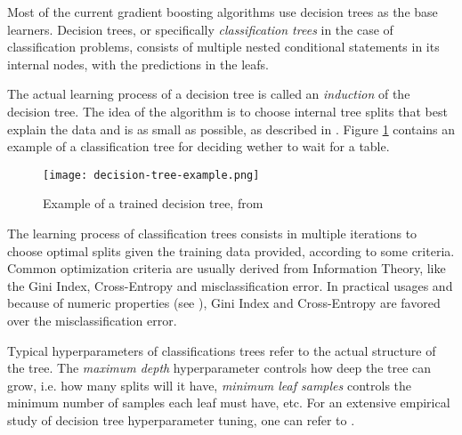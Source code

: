 Most of the current gradient boosting algorithms use decision trees as the base learners. Decision trees, or specifically \textit{classification trees} in the case of classification problems, consists of multiple nested conditional statements in its internal nodes, with the predictions in the leafs.

The actual learning process of a decision tree is called an \textit{induction} of the decision tree. The idea of the algorithm is to choose internal tree splits that best explain the data and is as small as possible, as described in \cite{aima:2010}. Figure \ref{fig:decision-tree-example} contains an example of a classification tree for deciding wether to wait for a table.

\begin{figure}[!h]
    \centering
    \texttt{[image: decision-tree-example.png]} 
    \caption{Example of a trained decision tree, from \cite{aima:2010}}
    \label{fig:decision-tree-example}
\end{figure}

The learning process of classification trees consists in multiple iterations to choose optimal splits given the training data provided, according to some criteria. Common optimization criteria are usually derived from Information Theory, like the Gini Index, Cross-Entropy and misclassification error. In practical usages and because of numeric properties (see \cite{hastie2009elements}), Gini Index and Cross-Entropy are favored over the misclassification error.

Typical hyperparameters of classifications trees refer to the actual structure of the tree. The \textit{maximum depth} hyperparameter controls how deep the tree can grow, i.e. how many splits will it have, \textit{minimum leaf samples} controls the minimum number of samples each leaf must have, etc. For an extensive empirical study of decision tree hyperparameter tuning, one can refer to \cite{mantovani2018empirical}.
